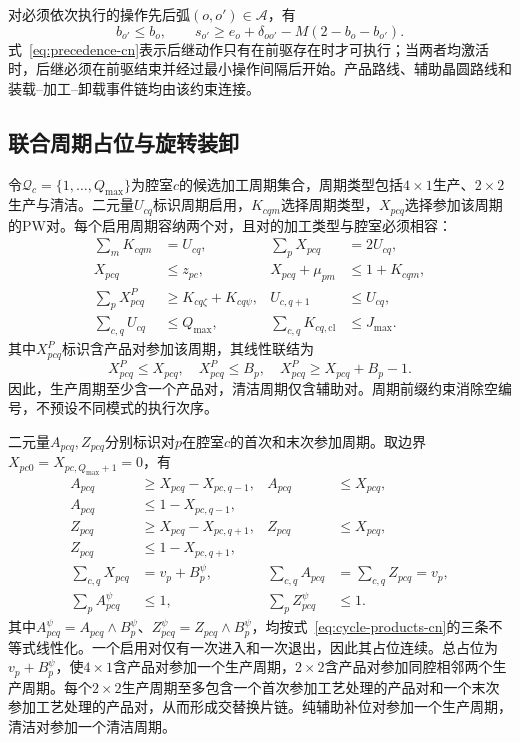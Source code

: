 \documentclass[final,5p,times,twocolumn]{elsarticle}
\begin{document}
对必须依次执行的操作先后弧$(o,o')\in\mathcal A$，有
\begin{equation}
b_{o'}\le b_o,\qquad
s_{o'}\ge e_o+\delta_{oo'}-M(2-b_o-b_{o'}).
\label{eq:precedence-cn}
\end{equation}
式~\eqref{eq:precedence-cn}表示后继动作只有在前驱存在时才可执行；当两者均激活时，后继必须在前驱结束并经过最小操作间隔后开始。产品路线、辅助晶圆路线和装载--加工--卸载事件链均由该约束连接。

\subsection{联合周期占位与旋转装卸}

令$\mathcal Q_c=\{1,\ldots,Q_{\max}\}$为腔室$c$的候选加工周期集合，周期类型包括$4\times1$生产、$2\times2$生产与清洁。二元量$U_{cq}$标识周期启用，$K_{cqm}$选择周期类型，$X_{pcq}$选择参加该周期的PW对。每个启用周期容纳两个对，且对的加工类型与腔室必须相容：
\begin{equation}
\begin{aligned}
\sum_mK_{cqm}&=U_{cq}, &\sum_pX_{pcq}&=2U_{cq},\\
X_{pcq}&\le z_{pc}, &X_{pcq}+\mu_{pm}&\le1+K_{cqm},\\
\sum_pX^P_{pcq}&\ge K_{cq\zeta}+K_{cq\psi}, &U_{c,q+1}&\le U_{cq},\\
\sum_{c,q}U_{cq}&\le Q_{\max}, &\sum_{c,q}K_{cq,\mathrm{cl}}&\le J_{\max}.
\end{aligned}
\label{eq:cycle-capacity-cn}
\end{equation}
其中$X^P_{pcq}$标识含产品对参加该周期，其线性联结为
\begin{equation}
X^P_{pcq}\le X_{pcq},\quad X^P_{pcq}\le B_p,\quad
X^P_{pcq}\ge X_{pcq}+B_p-1.
\label{eq:cycle-products-cn}
\end{equation}
因此，生产周期至少含一个产品对，清洁周期仅含辅助对。周期前缀约束消除空编号，不预设不同模式的执行次序。

二元量$A_{pcq},Z_{pcq}$分别标识对$p$在腔室$c$的首次和末次参加周期。取边界$X_{pc0}=X_{pc,Q_{\max}+1}=0$，有
\begin{equation}
\begin{aligned}
A_{pcq}&\ge X_{pcq}-X_{pc,q-1}, &A_{pcq}&\le X_{pcq},\\
A_{pcq}&\le1-X_{pc,q-1},\\
Z_{pcq}&\ge X_{pcq}-X_{pc,q+1}, &Z_{pcq}&\le X_{pcq},\\
Z_{pcq}&\le1-X_{pc,q+1},\\
\sum_{c,q}X_{pcq}&=v_p+B_p^{\psi}, &\sum_{c,q}A_{pcq}&=\sum_{c,q}Z_{pcq}=v_p,\\
\sum_pA^{\psi}_{pcq}&\le1, &\sum_pZ^{\psi}_{pcq}&\le1.
\end{aligned}
\label{eq:cycle-exposures-cn}
\end{equation}
其中$A^{\psi}_{pcq}=A_{pcq}\land B_p^{\psi}$、$Z^{\psi}_{pcq}=Z_{pcq}\land B_p^{\psi}$，均按式~\eqref{eq:cycle-products-cn}的三条不等式线性化。一个启用对仅有一次进入和一次退出，因此其占位连续。总占位为$v_p+B_p^{\psi}$，使$4\times1$含产品对参加一个生产周期，$2\times2$含产品对参加同腔相邻两个生产周期。每个$2\times2$生产周期至多包含一个首次参加工艺处理的产品对和一个末次参加工艺处理的产品对，从而形成交替换片链。纯辅助补位对参加一个生产周期，清洁对参加一个清洁周期。
\end{document}

